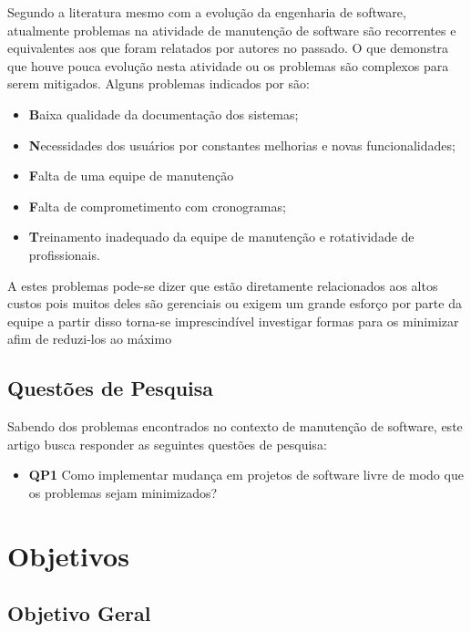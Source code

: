 Segundo a literatura mesmo com a evolução da engenharia de software, atualmente problemas na atividade de manutenção de software são recorrentes e equivalentes aos que foram relatados por autores no passado. O que demonstra que houve pouca evolução nesta atividade ou os problemas são complexos para serem mitigados. Alguns problemas indicados por  são: 
\begin{itemize}
\item \textbf Baixa qualidade da documentação dos sistemas;
\item \textbf Necessidades dos usuários por constantes melhorias e novas funcionalidades;
\item \textbf Falta de uma equipe de manutenção
\item \textbf Falta de comprometimento com cronogramas;
\item \textbf Treinamento inadequado da equipe de manutenção e rotatividade de profissionais.
\end{itemize}

A estes problemas pode-se dizer que estão diretamente relacionados aos altos custos pois muitos deles são gerenciais ou exigem um grande esforço por parte da equipe a partir disso torna-se imprescindível investigar formas para os minimizar afim de reduzi-los ao máximo

\subsection{Questões de Pesquisa}

%
Sabendo dos problemas encontrados no contexto de manutenção de software, este artigo busca responder as seguintes questões de pesquisa:

%

\begin{itemize}
\item \textbf{QP1} Como implementar mudança em projetos de software livre de modo que os problemas sejam minimizados?
\end{itemize}

\section{Objetivos}

\subsection{Objetivo Geral}

